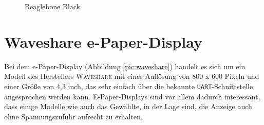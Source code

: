 \begin{figure}[ht]
  \centering
  \caption{Beaglebone Black}
  \label{pic:Beaglebone}
\end{figure}


\section{Waveshare e-Paper-Display}
Bei dem e-Paper-Display (Abbildung \ref{pic:waveshare}) handelt es sich um ein Modell des Herstellers \textsc{Waveshare} mit einer Auflösung von 800 x 600 Pixeln und einer Größe von 4,3 inch, das sehr einfach über die bekannte \texttt{UART}-Schnittstelle angesprochen werden kann. 
E-Paper-Displays sind vor allem dadurch interessant, dass einige Modelle wie auch das Gewählte, in der Lage sind, die Anzeige auch ohne Spannungszufuhr aufrecht zu erhalten.

